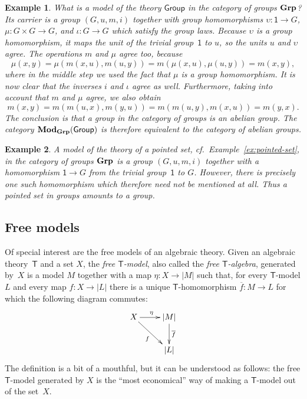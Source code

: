 \documentclass{amsart}
\newcommand{\theory}[1]{\mathsf{#1}} %
\newcommand{\ModC}[2]{\text{\textbf{Mod}}_{#1}(\theory{#2})} %
\newcommand{\category}[1]{\text{\textbf{#1}}} %
\newcommand{\carrier}[1]{|#1|} %
\newcommand{\one}{\mathsf{1}} %
\newtheorem{example}{Example}[section]
\begin{document}
\begin{example}
  What is a model of the theory $\theory{Group}$ in the category of groups $\category{Grp}$? Its
  carrier is a group $(G, u, m, i)$ together with group homomorphisms
  $\upsilon : \one \to G$, $\mu : G \times G \to G$, and $\iota : G \to G$ which satisfy
  the group laws. Because $\upsilon$ is a group homomorphism, it maps the unit of the
  trivial group~$\one$ to $u$, so the units $u$ and $\upsilon$ agree. The operations $m$
  and $\mu$ agree too, because
  \begin{equation*}
    \mu(x, y) =
    \mu(m(x, u), m(u, y)) =
    m(\mu(x, u), \mu(u, y)) =
    m(x, y),
  \end{equation*}
  where in the middle step we used the fact that $\mu$ is a group homomorphism. It is now
  clear that the inverses $i$ and $\iota$ agree as well. Furthermore, taking into account
  that $m$ and $\mu$ agree, we also obtain
  \begin{equation*}
    m(x, y) =
    m(m(u, x), m(y, u)) =
    m(m(u, y), m(x, u)) =
    m(y, x).
  \end{equation*}
  The conclusion is that a group in the category of groups is an abelian group. The
  category $\ModC{\category{Grp}}{Group}$ is therefore equivalent to the category of abelian groups.
\end{example}

\begin{example}
  A model of the theory of a pointed set, cf.\ Example~\ref{ex:pointed-set}, in the
  category of groups $\category{Grp}$ is a group $(G, u, m, i)$ together with a
  homomorphism $\one \to G$ from the trivial group~$\one$ to $G$. However, there is
  precisely one such homomorphism which therefore need not be mentioned at all. Thus a
  pointed set in groups amounts to a group.
\end{example}


\subsection{Free models}
\label{sec:free-models}

Of special interest are the free models of an algebraic theory. Given an
algebraic theory~$\theory{T}$ and a set $X$, the \emph{free $\theory{T}$-model},
also called the \emph{free $\theory{T}$-algebra}, generated by~$X$ is a model
$M$ together with a map $\eta : X \to \carrier{M}$ such that, for every
$\theory{T}$-model $L$ and every map $f : X \to \carrier{L}$ there is a unique
$\theory{T}$-homomorphism $\overline{f} : M \to L$ for which the following
diagram commutes:
%
\begin{equation*}
  \xymatrix{
    {X}
    \ar[r]^{\eta}
    \ar[rd]_{f}
    &
    {\carrier{M}}
    \ar[d]^{\overline{f}}
    \\
    &
     \carrier{L}
  }
\end{equation*}
%
The definition is a bit of a mouthful, but it can be understood as follows: the
free $\theory{T}$-model generated by $X$ is the ``most economical'' way of
making a $\theory{T}$-model out of the set~$X$.
\end{document}
